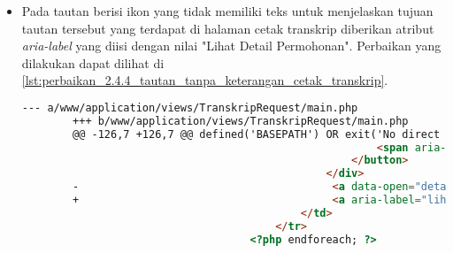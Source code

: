 \begin{itemize}
    \item Pada tautan berisi ikon yang tidak memiliki teks untuk menjelaskan tujuan tautan tersebut yang terdapat di halaman cetak transkrip diberikan atribut \textit{aria-label} yang diisi dengan nilai "Lihat Detail Permohonan". Perbaikan yang dilakukan dapat dilihat di \ref{lst:perbaikan_2.4.4_tautan_tanpa_keterangan_cetak_transkrip}.
    \begin{lstlisting}[frame=single, label={lst:perbaikan_2.4.4_tautan_tanpa_keterangan_cetak_transkrip}, language=HTML, caption=Perbaikan Kriteria Sukses 2.4.4 - Tautan Tanpa Keterangan di Halaman Manajemen Cetak Transkrip]
        --- a/www/application/views/TranskripRequest/main.php
        +++ b/www/application/views/TranskripRequest/main.php
        @@ -126,7 +126,7 @@ defined('BASEPATH') OR exit('No direct script access allowed');
                                                        <span aria-hidden="true">&times;</span>
                                                    </button>
                                                </div>
        -                                        <a data-open="detail<?= $request->id ?>"><i class="fi-eye"></i></a>
        +                                        <a aria-label="lihat detail permohonan" data-open="detail<?= $request->id ?>"><i class="fi-eye"></i></a>
                                            </td>
                                        </tr>
                                    <?php endforeach; ?>
    \end{lstlisting}


\end{itemize}
